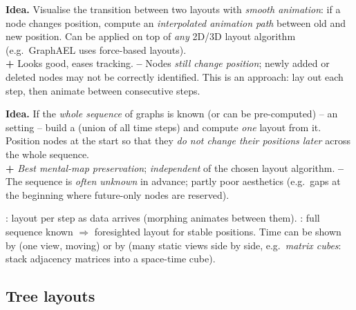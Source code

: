\begin{algobox}
\textbf{Idea.} Visualise the transition between two layouts with \emph{smooth
animation}: if a node changes position, compute an \emph{interpolated animation
path} between old and new position. Can be applied on top of \emph{any} 2D/3D
layout algorithm (e.g.\ GraphAEL uses force-based layouts).\\
\textbf{+} Looks good, eases tracking. \textbf{--} Nodes \emph{still change
position}; newly added or deleted nodes may not be correctly identified. This is
an  approach: lay out each step, then animate between consecutive
steps.
\end{algobox}

\begin{algobox}
\textbf{Idea.} If the \emph{whole sequence} of graphs is known (or can be
pre-computed) -- an  setting -- build a  (union of
all time steps) and compute \emph{one} layout from it. Position nodes at the
start so that they \emph{do not change their positions later} across the whole
sequence.\\
\textbf{+} \emph{Best mental-map preservation}; \emph{independent} of the chosen
layout algorithm. \textbf{--} The sequence is \emph{often unknown} in advance;
partly poor aesthetics (e.g.\ gaps at the beginning where future-only nodes are
reserved).
\end{algobox}

\begin{keybox}
: layout per step as data arrives (morphing animates between them).
: full sequence known $\Rightarrow$ foresighted layout for stable
positions. Time can be shown by  (one view, moving) or by
 (many static views side by side, e.g.\
\emph{matrix cubes}: stack adjacency matrices into a space-time cube).
\end{keybox}

\subsection{Tree layouts}

